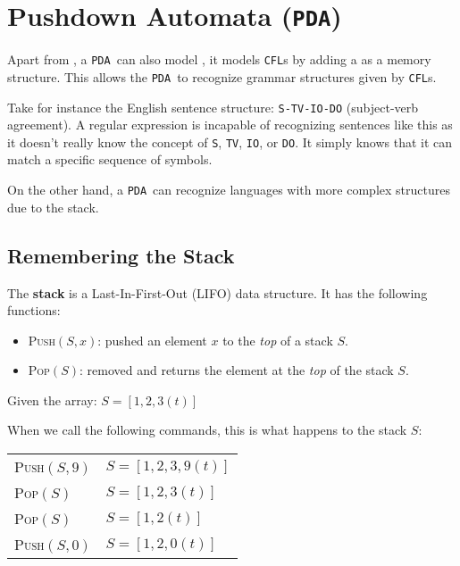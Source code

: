 \newcommand{\pda}{\texttt{PDA}}
\section{Pushdown Automata (\pda)}

Apart from , a \pda\, can also model , it models \texttt{CFL}s by adding a  as a memory structure. This allows the \pda\, to recognize grammar structures given by \texttt{CFL}s.

Take for instance the English sentence structure: \texttt{S-TV-IO-DO} (subject-verb agreement). A regular expression is incapable of recognizing sentences like this as it doesn't really know the concept of \texttt{S}, \texttt{TV}, \texttt{IO}, or \texttt{DO}. It simply knows that it can match a specific sequence of symbols.

On the other hand, a \pda\, can recognize languages with more complex structures due to the stack.

\subsection{Remembering the Stack}

The \textbf{stack} is a Last-In-First-Out (LIFO) data structure. It has the following functions:
\begin{itemize}
    \item \textsc{Push}$(S,x)$: pushed an element $x$ to the \textit{top} of a stack $S$.
    \item \textsc{Pop}$(S)$: removed and returns the element at the \textit{top} of the stack $S$.
\end{itemize}

\begin{ex}
    Given the array: $S=[1,2,3(t)]$
\end{ex}
When we call the following commands, this is what happens to the stack $S$:
\begin{center}
    \begin{tabular}{ll}
        \textsc{Push}$(S,9)$ & $S = [1,2,3,9(t)]$  \\
        \textsc{Pop}$(S)$    & $S = [1,2,3(t)]$ \\
        \textsc{Pop}$(S)$    & $S = [1,2(t)]$ \\
        \textsc{Push}$(S,0)$    & $S = [1,2,0(t)]$ \\
    \end{tabular}
\end{center}

